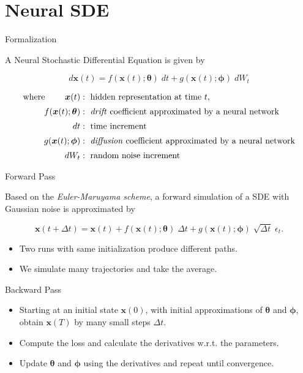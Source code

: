 \section{Neural SDE}


\begin{frame}{Formalization}

A Neural Stochastic Differential Equation is given by

$$d\boldsymbol{x}(t) = f(\boldsymbol{x}(t); \boldsymbol{\theta}) \; dt + g(\boldsymbol{x}(t); \boldsymbol{\phi}) \; dW_t$$

\begin{align*}
\text{where } \qquad \boldsymbol{x}(t) &: \text{ hidden representation at time }t, \\[0.2em]
f(\boldsymbol{x}(t); \boldsymbol{\theta}) &: \text{ \textit{drift} coefficient approximated by a neural network} \\[0.2em]
dt &: \text{ time increment} \\[0.2em]
g(\boldsymbol{x}(t); \boldsymbol{\phi}) &: \text{ \textit{diffusion} coefficient approximated by a neural network} \\[0.2em]
dW_t &: \text{ random noise increment}
\end{align*}
\end{frame}



\begin{frame}{Forward Pass}

Based on the \textit{Euler-Maruyama scheme}, a forward simulation of a SDE with Gaussian noise is approximated by

$$\boldsymbol{x}(t+\Delta t) = \boldsymbol{x}(t)+ f(\boldsymbol{x}(t); \boldsymbol{\theta}) \; \Delta t + g(\boldsymbol{x}(t); \boldsymbol{\phi}) \; \sqrt{\Delta t} \; \epsilon_t.$$

\begin{itemize}
\item<1-> Two runs with same initialization produce different paths.

\item<2-> We simulate many trajectories and take the average.
\end{itemize}
\end{frame}



\begin{frame}{Backward Pass}

\begin{itemize}
\item<1-> Starting at an initial state $\boldsymbol{x}(0)$, with initial approximations of $\boldsymbol{\theta}$ and $\boldsymbol{\phi}$, obtain $\boldsymbol{x}(T)$ by many small steps $\Delta t$.

\item<2-> Compute the loss and calculate the derivatives w.r.t. the parameters.

\item<3-> Update $\boldsymbol{\theta}$ and $\boldsymbol{\phi}$ using the derivatives and repeat until convergence.
\end{itemize}

\end{frame}



